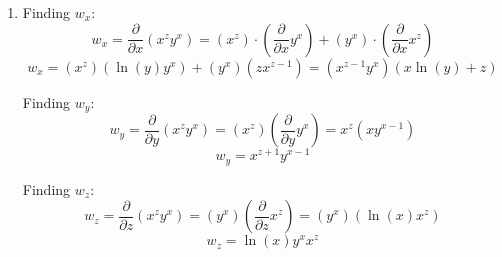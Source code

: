 \begin{Answer}[ref = three]
\begin{enumerate}
    \item Finding $w_x$:
    $$w_x = \frac{\partial}{\partial x} \left( x^z y^x \right) = \left( x^z 
    \right) \cdot \left( \frac{\partial}{\partial x} y^x \right) + \left( y^x 
    \right) \cdot \left( \frac{\partial}{\partial x} x^z \right)$$
    $$w_x = \left(x^z \right) \left( \ln{ \left( y \right)} y^x \right) + 
    \left( y^x \right) \left(zx^{z-1} \right) = \left(x^{z-1} y^x \right) 
    \left( x\ln{\left( y \right)} + z \right)$$

    Finding $w_y$:
    $$w_y = \frac{\partial}{\partial y} \left(x^z y^x \right) = \left( x^z 
    \right) \left( \frac{\partial}{\partial y} y^x \right) = x^z \left( xy^{
    x - 1} \right)$$
    $$w_y = x^{z + 1} y^{x - 1}$$

    Finding $w_z$:
    $$w_z = \frac{\partial}{\partial z} \left( x^z y^x \right) = \left( y^x 
    \right) \left( \frac{\partial}{\partial z} x^z \right) = \left( y^x \right)
    \left( \ln{\left(x \right)} x^z \right)$$
    $$w_z = \ln{ \left(x \right)} y^x x^z$$
\end{enumerate}
\end{Answer}